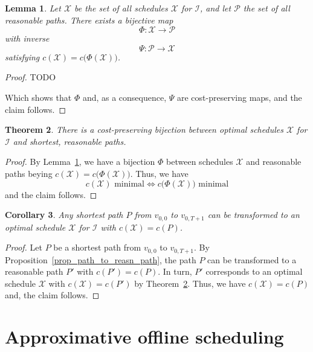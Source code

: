 \documentclass[hidelinks]{article}
\theoremstyle{plain}
\newtheorem{thm}{Theorem}[section]
\newtheorem{lem}[thm]{Lemma}
\newtheorem{cor}[thm]{Corollary}
\theoremstyle{definition}
\theoremstyle{rem}
\newcommand{\mx}{\mathcal{X}}
\newcommand{\inp}{\mathcal{I}}
\newcommand{\costs}{c}
\begin{document}
\begin{lem}\label{lem_sched_path_pseudo_lin}
Let $\bm{\mx}$ be the set of all schedules $\mx$ for $\inp$, and let $\bm{\mathcal{P}}$ the set of all reasonable paths. There exists a bijective map 
\begin{equation*}
	\Phi:\bm{\mx}\rightarrow\bm{\mathcal{P}}
\end{equation*}
with inverse
\begin{equation*}
	\Psi:\bm{\mathcal{P}}\rightarrow\bm{\mx}
\end{equation*}
satisfying $\costs(\mx)=\costs\bigl(\Phi(\mx)\bigr)$.
\end{lem}
\begin{proof}
TODO

Which shows that $\Phi$ and, as a consequence, $\Psi$ are cost-preserving maps, and the claim follows.
\end{proof}
\begin{thm}\label{thm_opt_sched_reasn_path}
There is a cost-preserving bijection between optimal schedules $\mx$ for $\inp$ and shortest, reasonable paths.
\end{thm} 
\begin{proof}
By Lemma~\ref{lem_sched_path_pseudo_lin}, we have a bijection $\Phi$ between schedules $\mx$ and reasonable paths beying $\costs(\mx)=\costs\bigl(\Phi(\mx)\bigr)$. Thus, we have 
\begin{equation*}
	\costs(\mx)\text{ minimal}\iff \costs\bigl(\Phi(\mx)\big)\text{ minimal}
\end{equation*}
and the claim follows.
\end{proof}
\begin{cor}
Any shortest path $P$ from $v_{0,0}$ to $v_{0,T+1}$ can be transformed to an optimal schedule $\mx$ for $\inp$ with $\costs(\mx)=\costs(P)$.
\end{cor}
\begin{proof}
Let $P$ be a shortest path from $v_{0,0}$ to $v_{0,T+1}$. By Proposition~\ref{prop_path_to_reasn_path}, the path $P$ can be transformed to a reasonable path $P'$ with $\costs(P')=\costs(P)$.
In turn, $P'$ corresponds to an optimal schedule $\mx$ with $\costs(\mx)=\costs(P')$ by Theorem~\ref{thm_opt_sched_reasn_path}. Thus, we have $c(\mx)=c(P)$ and, the claim follows.
\end{proof}

\section{Approximative offline scheduling}
\end{document}
